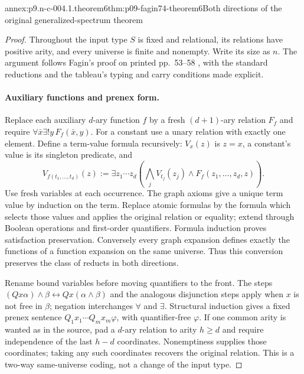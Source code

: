 
\begin{annexitem}{annex:p9.n-c-004.1.theorem6}{thm:p09-fagin74-theorem6}{Both directions of the original generalized-spectrum theorem}
\begin{proof}
Throughout the input type \(S\) is fixed and relational, its relations have
positive arity, and every universe is finite and nonempty.  Write its size
as \(n\).  The argument follows Fagin's proof on printed pp.~53--58
\cite{Fagin1974}, with the standard reductions and the tableau's typing and
carry conditions made explicit.

\paragraph{Auxiliary functions and prenex form.}
Replace each auxiliary \(d\)-ary function \(f\) by a fresh
\((d+1)\)-ary relation \(F_f\) and require
\(\forall\bar x\exists!y\,F_f(\bar x,y)\).  For a constant use a unary
relation with exactly one element.  Define a term-value formula recursively:
\(V_x(z)\) is \(z=x\), a constant's value is its singleton predicate,
and
\[
 V_{f(t_1,\ldots,t_d)}(z):=
 \exists z_1\cdots z_d
  \left(\bigwedge_j V_{t_j}(z_j)\land F_f(z_1,\ldots,z_d,z)\right).
\]
Use fresh variables at each occurrence.  The graph axioms give a unique term
value by induction on the term.  Replace atomic formulas by the formula
which selects those values and applies the original relation or equality;
extend through Boolean operations and first-order quantifiers.  Formula
induction proves satisfaction preservation.  Conversely every graph expansion
defines exactly the functions of a function expansion on the same universe.
Thus this conversion preserves the class of reducts in both directions.

Rename bound variables before moving quantifiers to the front.  The steps
\((Qx\alpha)\land\beta\longleftrightarrow Qx(\alpha\land\beta)\)
and the analogous disjunction steps apply when \(x\) is not free in
\(\beta\); negation interchanges \(\forall\) and \(\exists\).
Structural induction gives a fixed prenex sentence
\(Q_1x_1\cdots Q_mx_m\varphi\), with quantifier-free \(\varphi\).
If one common arity is wanted as in the source, pad a \(d\)-ary relation
to arity \(h\geq d\) and require independence of the last \(h-d\)
coordinates.  Nonemptiness supplies those coordinates; taking any such
coordinates recovers the original relation.  This is a two-way same-universe
coding, not a change of the input type.


\end{proof}
\end{annexitem}
